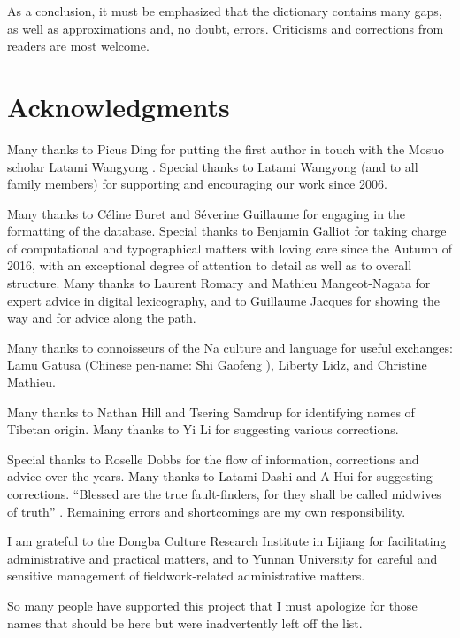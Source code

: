 As a conclusion, it must be emphasized that the dictionary contains many gaps, as well as approximations and, no doubt, errors. Criticisms and corrections from readers are most welcome.

\section*{Acknowledgments}

Many thanks to Picus Ding for putting the first author in touch with the Mosuo scholar Latami Wangyong . Special thanks to Latami Wangyong (and to all family members) for supporting and encouraging our work since 2006. %

Many thanks to Céline Buret and Séverine Guillaume for engaging in the formatting of the database. Special thanks to Benjamin Galliot for taking charge of computational and typographical matters with loving care since the Autumn of 2016, with an exceptional degree of attention to detail as well as to overall structure. Many thanks to Laurent Romary and Mathieu Mangeot-Nagata for expert advice in digital lexicography, and to Guillaume Jacques for showing the way and for advice along the path.

Many thanks to connoisseurs of the Na culture and language for useful exchanges: Lamu Gatusa  (Chinese pen-name: Shi Gaofeng ), Liberty Lidz, and Christine Mathieu.

Many thanks to Nathan Hill and Tsering Samdrup for identifying names of Tibetan origin. Many thanks to Yi Li  for suggesting various corrections.

Special thanks to Roselle Dobbs for the flow of information, corrections and advice over the years. Many thanks to Latami Dashi  and A Hui  for suggesting corrections. ``Blessed are the true fault-finders, for they shall be called midwives of truth'' \parencite[vi]{yliniemi_descriptive_2022}. Remaining errors and shortcomings are my own responsibility.

I am grateful to the Dongba Culture Research Institute  in Lijiang for facilitating administrative and practical matters, and to Yunnan University for careful and sensitive management of fieldwork-related administrative matters.

So many people have supported this project that I must apologize for those names that should be here but were inadvertently left off the list.

